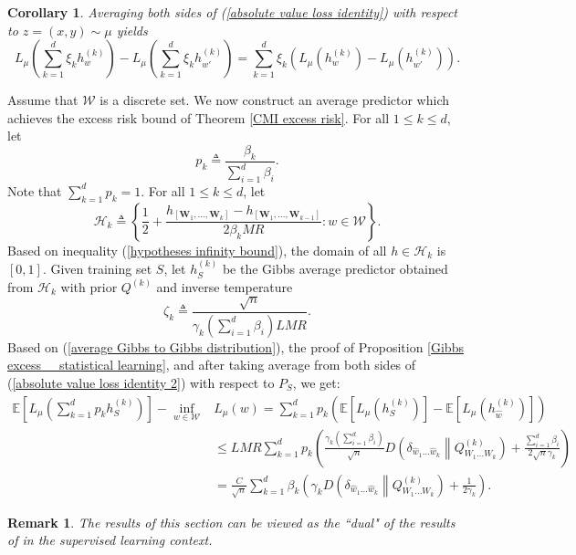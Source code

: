 \documentclass{article}
\newtheorem{remark}{Remark}
\newtheorem{corollary}{Corollary}
\newcommand{\E}{\mathbb{E}}
\newcommand{\W}[0]{\mathcal{W}}
\begin{document}
\begin{corollary} Averaging both sides of (\ref{absolute value loss identity}) with respect to $z=(x,y)\sim \mu$ yields
\begin{equation}\label{absolute value loss identity 2}
	L_{\mu}\left(\sum_{k=1}^d \xi_k h^{(k)}_w\right)-L_{\mu}\left(\sum_{k=1}^d \xi_k h^{(k)}_{w'}\right)=\sum_{k=1}^d \xi_k \left(L_{\mu}\left(h^{(k)}_w\right)-L_{\mu}\left(h^{(k)}_{w'}\right)\right).
\end{equation}
\end{corollary}

Assume that $\W$ is a discrete set. We now construct an average predictor which achieves the excess risk bound of Theorem \ref{CMI excess risk}. For all $1\leq k\leq d$, let 
\begin{equation}\nonumber
	p_k\triangleq \frac{\beta_k}{\sum_{i=1}^d \beta_i}.
\end{equation}
Note that $\sum_{k=1}^d p_k=1$. For all $1\leq k\leq d$, let 
\begin{equation}\nonumber
	\mathcal{H}_k\triangleq \left\{\frac{1}{2}+\frac{h_{[\mathbf{W}_1,\dots,\mathbf{W}_k]}-h_{[\mathbf{W}_1,\dots,\mathbf{W}_{k-1}]}}{2\beta_kMR}:w\in \W \right\}.
\end{equation}
Based on inequality (\ref{hypotheses infinity bound}), the domain of all $h\in \mathcal{H}_k$ is $[0,1]$. Given training set $S$, let $h_S^{(k)}$ be the Gibbs average predictor obtained from $\mathcal{H}_k$ with prior $Q^{(k)}$ and inverse temperature 
\begin{equation}\nonumber
	\zeta_k\triangleq \frac{\sqrt{n}}{\gamma_k(\sum_{i=1}^d \beta_i)LMR}.
\end{equation} 
Based on (\ref{average Gibbs to Gibbs distribution}), the proof of Proposition \ref{Gibbs excess _ statistical learning}, and after taking average from both sides of (\ref{absolute value loss identity 2}) with respect to $P_S$, we get:
\begin{align*}
	\E\left[L_{\mu}\left(\sum_{k=1}^d p_k h^{(k)}_S\right) \right]-\inf_{w\in \W}&L_{\mu}(w)=\sum_{k=1}^d p_k \left(\E \left[L_{\mu}\left(h^{(k)}_S\right)\right]-\E \left[L_{\mu}\left(h^{(k)}_{\widehat{w}}\right)\right]\right)  \\ 
	&\leq LMR\sum_{k=1}^d p_k\left(\frac{\gamma_k(\sum_{i=1}^d \beta_i)}{\sqrt{n}}D\left(\delta_{\widehat{w}_1 \dots \widehat{w}_k}\middle\|Q^{(k)}_{W_1\dots W_k}\right)+ \frac{\sum_{i=1}^d\beta_i}{2\sqrt{n}\gamma_k} \right)\\
	&=\frac{C}{\sqrt{n}}\sum_{k=1}^d \beta_k\left(\gamma_k D\left(\delta_{\widehat{w}_1 \dots \widehat{w}_k}\middle\|Q^{(k)}_{W_1\dots W_k}\right)+\frac{1}{2\gamma_k} \right).
\end{align*}
 
\begin{remark}\normalfont
	The results of this section can be viewed as the ``dual" of the results of \cite{cesa1999prediction} in the supervised learning context. 
\end{remark} 
\end{document}
